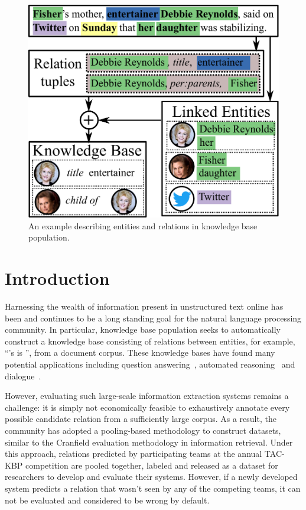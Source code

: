 \begin{figure}[t]
  \centering
  \includegraphics[width=0.9\columnwidth]{figures/entities-example.pdf}
  \caption{\label{fig:example} An example describing entities and relations in knowledge base population.}
\end{figure}

\section{Introduction}
\label{sec:intro}

Harnessing the wealth of information present in unstructured text online has been and continues to be a long standing goal for the natural language processing community.
In particular, knowledge base population seeks to automatically construct a knowledge base consisting of relations between entities, for example, ``'s  is '', from a document corpus. 
These knowledge bases have found many potential applications including question answering~\citep{berant2013freebase, fader2014open,reddy2014large}, automated reasoning~\citep{kalyanpur2012structured} and dialogue~\citep{lee2015conversational,han2015exploiting}.

However, evaluating such large-scale information extraction systems remains a challenge:
it is simply not economically feasible to exhaustively annotate every possible candidate relation from a sufficiently large corpus.
As a result, the community has adopted a pooling-based methodology to construct datasets, similar to the Cranfield evaluation methodology in information retrieval.
Under this approach, relations predicted by participating teams at the annual TAC-KBP competition are pooled together, labeled and released as a dataset for researchers to develop and evaluate their systems.
However, if a newly developed system predicts a relation that wasn't seen by any of the competing teams, it can not be evaluated and considered to be wrong by default. 

